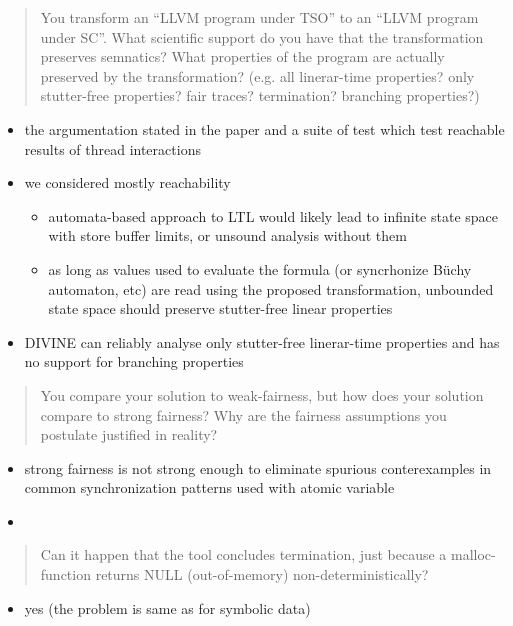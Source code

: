 \documentclass[aspectratio=169, fi]{paradise-slide}
\newcommand{\rquote}[1]{\begin{quote}#1\end{quote}\bigskip\setlength{\leftmargini}{1em}}
\begin{document}
\begin{frame}{\qtitle}
  \rquote{You transform an ``LLVM program under TSO'' to an ``LLVM program under SC''. What
  scientific support do you have that the transformation preserves semnatics? What properties of the
  program are actually preserved by the transformation? (e.g. all linerar-time properties? only
  stutter-free properties? fair traces? termination? branching properties?)}
  \begin{itemize}
    \item the argumentation stated in the paper and a suite of test which test reachable results of
      thread interactions
    \item we considered mostly reachability
      \begin{itemize}
        \item automata-based approach to LTL would likely lead to infinite state space with store
          buffer limits, or unsound analysis without them
        \item as long as values used to evaluate the formula (or syncrhonize Büchy automaton, etc)
          are read using the proposed transformation, unbounded state space should preserve
          stutter-free linear properties
      \end{itemize}
    \item DIVINE can reliably analyse only stutter-free linerar-time properties and has no support
      for branching properties
  \end{itemize}
\end{frame}

\begin{frame}{\qtitle}
  \rquote{You compare your solution to weak-fairness, but how does your solution compare to strong
    fairness? Why are the fairness assumptions you postulate justified in reality?}
  \begin{itemize}
    \item strong fairness is not strong enough to eliminate spurious conterexamples in common
      synchronization patterns used with atomic variable
    \item 
  \end{itemize}
\end{frame}

\begin{frame}{\qtitle}
  \rquote{Can it happen that the tool concludes termination, just because a malloc-function returns
    NULL (out-of-memory) non-deterministically?}
  \begin{itemize}
    \item yes (the problem is same as for symbolic data)
  \end{itemize}
\end{frame}
\end{document}
